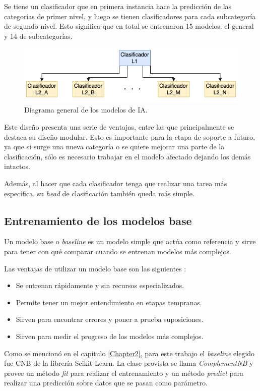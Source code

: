 Se tiene un clasificador que en primera instancia hace la predicción de las categorías de primer nivel, y luego se tienen clasificadores para cada subcategoría de segundo nivel. Esto significa que en total se entrenaron 15 modelos: el general y 14 de subcategorías.

\begin{figure}[htbp]
	\centering
	\includegraphics[width=.8\textwidth]{./Figures/cap3-redes.png}
	\caption{Diagrama general de los modelos de IA.}
	\label{fig:cap3-redes}
\end{figure}

Este diseño presenta una serie de ventajas, entre las que principalmente se destaca su diseño modular. Esto es importante para la etapa de soporte a futuro, ya que si surge una nueva categoría o se quiere mejorar una parte de la clasificación, sólo es necesario trabajar en el modelo afectado dejando los demás intactos.

Además, al hacer que cada clasificador tenga que realizar una tarea más específica, su \textit{head} de clasificación también queda más simple.

\subsection{Entrenamiento de los modelos base}

Un modelo base o \textit{baseline} es un modelo simple que actúa como referencia y sirve para tener con qué comparar cuando se entrenan modelos más complejos. 

Las ventajas de utilizar un modelo base son las siguientes \citep{WEBSITE:23}:
\begin{itemize}
	\item Se entrenan rápidamente y sin recursos especializados.
	\item Permite tener un mejor entendimiento en etapas tempranas.
	\item Sirven para encontrar errores y poner a prueba suposiciones.
	\item Sirven para medir el progreso de los modelos más complejos.
\end{itemize}

Como se mencionó en el capítulo \ref{Chapter2}, para este trabajo el \textit{baseline} elegido fue CNB de la librería Scikit-Learn. La clase provista se llama \textit{ComplementNB} y provee un método \textit{fit} para realizar el entrenamiento y un método \textit{predict} para realizar una predicción sobre datos que se pasan como parámetro.

